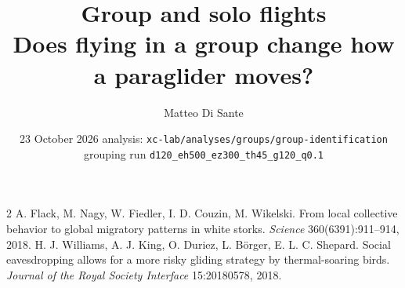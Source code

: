 \documentclass[10pt,a4paper]{article}
\title{\textbf{Group and solo flights}\\[2pt]
  \large Does flying in a group change how a paraglider moves?}
\author{Matteo Di Sante}
\date{23 October 2026 \;\textbullet\; analysis: \texttt{xc-lab/analyses/groups/group-identification} \;\textbullet\;
  grouping run \texttt{d120\_eh500\_ez300\_th45\_g120\_q0.1}}
\begin{document}
\maketitle













\begin{thebibliography}{2}\small
{} A. Flack, M. Nagy, W. Fiedler, I. D. Couzin, M. Wikelski. From local collective
behavior to global migratory patterns in white storks. \emph{Science} 360(6391):911--914, 2018.
 H. J. Williams, A. J. King, O. Duriez, L. Börger, E. L. C. Shepard. Social
eavesdropping allows for a more risky gliding strategy by thermal-soaring birds. \emph{Journal of
the Royal Society Interface} 15:20180578, 2018.
\end{thebibliography}

\clearpage
\appendix

\end{document}
